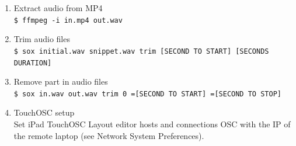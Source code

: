\begin{description}
\begin{enumerate}
\begin{figure}[!hbt]
\begin{center}
	\end{center}
\end{figure}\\
\textit{D'origine allemande, MS signifie} \textsl{Mitte Seite} \textit{en Allemand et} \textsl{Middle-Side} \textit{en Anglais.
La radio st\'{e}r\'{e}ophonique transmet le signal sous la forme d'un signal monophonique, et d'un signal de diff\'{e}rence entre canaux, qui s'ajoute \`{a} gauche et se retranche \`{a} droite. La prise de son MS utilise le m\^{e}me principe d\`{e}s la captation. Une capsule cardio\"{i}de ou omnidirectionnelle est point\'{e}e vers le centre de la sc\`{e}ne sonore, une deuxi\`{e}me capsule, \`{a} directivit\'{e} en 8, est plac\'{e} perpendiculairement aussi pr\`{e}s de la premi\`{e}re que possible,
Le passage des canaux gauche et droite aux canaux M et S, et inversement, s'effectue par un proc\'{e}d\'{e} de somme et diff\'{e}rences dit matri\c{c}age:}\\ \\
$M = L + R$\\
$S = L - R$\\
$M + S = ( L + R ) + ( L - R ) = 2L$\\
$M - S = ( L + R ) - ( L - R ) = 2R$\\ \\
\textit{La profondeur de l'effet st\'{e}r\'{e}o se r\`{e}gle facilement en ajustant l'intensit\'{e} relative des deux composantes.}\footnote{Captation st\'{e}r\'{e}ophonique. \textit{Wikip\'{e}dia, l'encyclop\'{e}die libre.} [Page consult\'{e}e le 31/07/20]\\ \indent \href{http://fr.wikipedia.org/w/index.php?title=Captation\_st\%C3\%A9r\%C3\%A9ophonique}{\scriptsize{\texttt{http://fr.wikipedia.org/w/index.php?title=Captation\_st\%C3\%A9r\%C3\%A9ophonique}}} \normalsize{}}\\
\item Extract audio from MP4\\
\texttt{\scriptsize \$ ffmpeg -i in.mp4 out.wav}
\item Trim audio files\\ 
\texttt{\scriptsize \$ sox initial.wav snippet.wav trim [SECOND TO START] [SECONDS DURATION]}
\item Remove part in audio files\\ 
\texttt{\scriptsize \$ sox in.wav out.wav trim 0 =[SECOND TO START] =[SECOND TO STOP]}
\item TouchOSC setup\\ 
Set iPad TouchOSC \textsf{Layout editor hosts} and \textsf{connections OSC} with the IP of the remote laptop (see \textsf{Network System Preferences}).

\end{enumerate}
\end{description}
